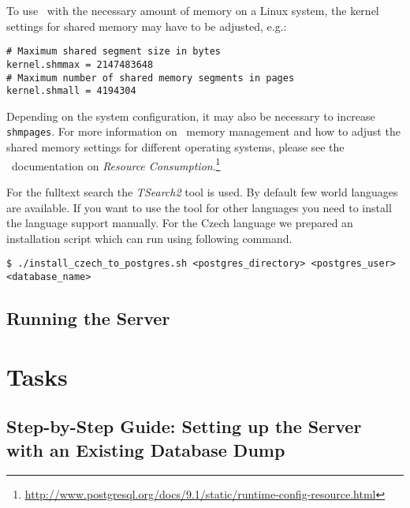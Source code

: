 To use \postgres~with the necessary amount of memory on a Linux system, the kernel settings for shared memory may have to be adjusted, e.g.:

\vspace*{0.5em}
\begin{lstlisting}
# Maximum shared segment size in bytes
kernel.shmmax = 2147483648
# Maximum number of shared memory segments in pages
kernel.shmall = 4194304
\end{lstlisting}
\vspace*{0.5em}

Depending on the system configuration, it may also be necessary to increase {\tt shmpages}. For more information on \postgres~memory management and how to adjust the shared memory settings for different operating systems, please see the \postgres~documentation on \emph{Resource Consumption}.\footnote{\url{http://www.postgresql.org/docs/9.1/static/runtime-config-resource.html}}

For the fulltext search the \emph{TSearch2} tool is used. By default few world languages are available. If you want to use the tool for other languages you need to install the language support manually. For the Czech language we prepared an installation script which can run using following command.

\vspace*{0.5em}
\begin{lstlisting}
$ ./install_czech_to_postgres.sh <postgres_directory> <postgres_user> <database_name>
\end{lstlisting}
\vspace*{0.5em}

\subsection{Running the Server}


\section{Tasks}

\subsection{Step-by-Step Guide: Setting up the Server with an Existing Database Dump}

